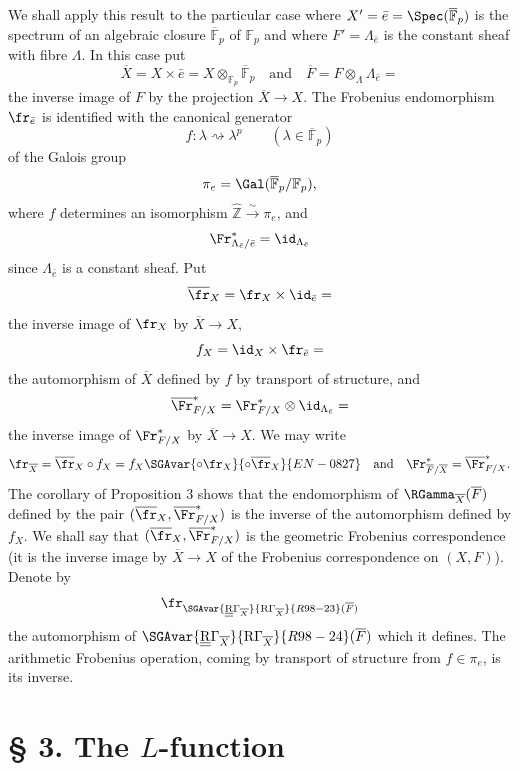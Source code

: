 We shall apply this result to the particular case where
$X'=\bar e=\Spec(\overline{\mathbb F}_p)$ is the spectrum of an
algebraic closure $\overline{\mathbb F}_p$ of $\mathbb F_p$ and where
$F'=\Lambda_{\bar e}$ is the constant sheaf with fibre $\Lambda$.
In this case put
\[
\overline X=X\times\bar e
=X\otimes_{\mathbb F_p}\overline{\mathbb F}_p
\quad\text{and}\quad
\overline F=F\otimes_\Lambda\Lambda_{\bar e}=
\]
the inverse image of $F$ by the projection $\overline X\to X$.
The Frobenius endomorphism $\fr_{\bar e}$ is identified with the
canonical generator
\[
f:\lambda\rightsquigarrow\lambda^p
\qquad(\lambda\in\overline{\mathbb F}_p)
\]
of the Galois group
\[
\pi_e=\Gal(\overline{\mathbb F}_p/\mathbb F_p),
\]
where $f$ determines an isomorphism
$\widehat{\mathbb Z}\xrightarrow{\sim}\pi_e$, and
\[
\Fr^*_{\Lambda_{\bar e}/\bar e}=\id_{\Lambda_{\bar e}}
\]
since $\Lambda_{\bar e}$ is a constant sheaf. Put
\[
\overline{\fr}_X=\fr_X\times\id_{\bar e}=
\]
the inverse image of $\fr_X$ by $\overline X\to X$,
\[
f_X=\id_X\times\fr_{\bar e}=
\]
the automorphism of $\overline X$ defined by $f$ by transport of
structure, and
\[
\overline{\Fr}^*_{F/X}
=\Fr^*_{F/X}\otimes\id_{\Lambda_{\bar e}}=
\]
the inverse image of $\Fr^*_{F/X}$ by $\overline X\to X$. We may write
\[
\fr_{\overline X}
=\overline{\fr}_X\circ f_X
=f_X\SGAvar{\circ{\fr}_X}{\circ\overline{\fr}_X}{EN-0827}
\quad\text{and}\quad
\Fr^*_{\overline F/\overline X}
=\overline{\Fr}^*_{F/X}.
\]
The corollary of Proposition 3 shows that the endomorphism of
$\RGamma_{\overline X}(\overline F)$ defined by the pair
$(\overline{\fr}_X,\overline{\Fr}^*_{F/X})$ is the inverse of the
automorphism defined by $f_X$. We shall say that
$(\overline{\fr}_X,\overline{\Fr}^*_{F/X})$ is the geometric
Frobenius correspondence (it is the inverse image by
$\overline X\to X$ of the Frobenius correspondence on $(X,F)$). Denote by
\[
\fr_{\SGAvar{\underline{\underline{\mathrm{R}}}\Gamma_{\overline X}}{\mathrm{R}\Gamma_{\overline X}}{R98-23}(\overline F)}
\]
the automorphism of $\SGAvar{\underline{\underline{\mathrm{R}}}\Gamma_{\overline X}}{\mathrm{R}\Gamma_{\overline X}}{R98-24}(\overline F)$ which it
defines. The arithmetic Frobenius operation, coming by transport of
structure from $f\in\pi_e$, is its inverse.

\section*{§ 3. The $L$-function}

